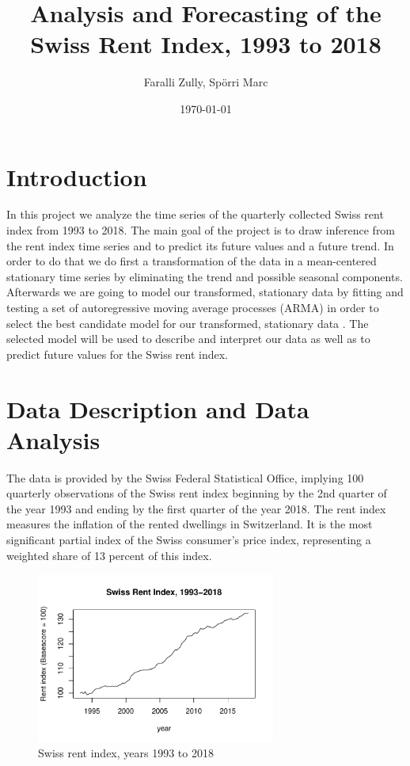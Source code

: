 \documentclass[11pt,a4paper]{article}
\title{Analysis and Forecasting of the Swiss Rent Index, 1993 to 2018}
\author{Faralli Zully, Spörri Marc}
\date{\today}
\begin{document}

\maketitle
\newpage
\tableofcontents
\newpage



\section{Introduction}

In this project we analyze the time series of the quarterly collected Swiss rent index from 1993 to 2018.
The main goal of the project is to draw inference from the rent index time series and to predict its future values and a future trend.
In order to do that we do first a transformation of the data in a mean-centered stationary time series by eliminating the trend and possible seasonal components.
Afterwards we are going to model our transformed, stationary data by fitting and testing a set of autoregressive moving average processes (ARMA) in order to select the best candidate model for our transformed, stationary data \cite[p.~82--110]{bd02}.
The selected model will be used to describe and interpret our data as well as to predict future values for the Swiss rent index.



\section{Data Description and Data Analysis}

The data is provided by the Swiss Federal Statistical Office, implying 100 quarterly observations of the Swiss rent index beginning by the 2nd quarter of the year 1993 and ending by the first quarter of the year 2018.
The rent index measures the inflation of the rented dwellings in Switzerland.
It is the most significant partial index of the Swiss consumer’s price index, representing a weighted share of 13 percent of this index.

\begin{figure} [ht]
    \centering
    \includegraphics[width=0.7\textwidth]{indiceloyers_timeseries}
    \caption{Swiss rent index, years 1993 to 2018}
    \label{fig:indiceloyers_timeseries}
\end{figure}
\end{document}
